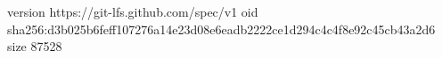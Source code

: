 version https://git-lfs.github.com/spec/v1
oid sha256:d3b025b6feff107276a14e23d08e6eadb2222ce1d294c4c4f8e92c45cb43a2d6
size 87528
